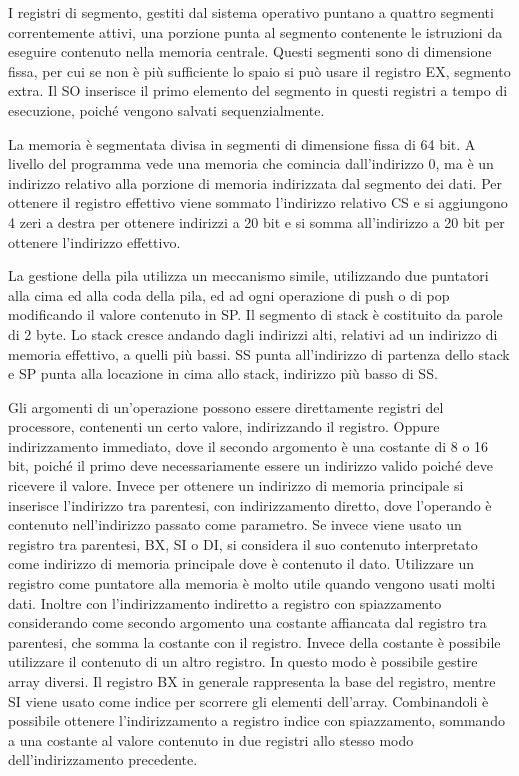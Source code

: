 \documentclass{article}
\numberwithin{equation}{subsection}
\begin{document}
I registri di segmento, gestiti dal sistema operativo puntano a quattro segmenti correntemente attivi, una porzione punta al segmento contenente le istruzioni da eseguire 
contenuto nella memoria centrale. Questi segmenti sono di dimensione fissa, per cui se non è più sufficiente lo spaio si può usare il registro EX, segmento extra. 
Il SO inserisce il primo elemento del segmento in questi registri a tempo di esecuzione, poiché vengono salvati sequenzialmente. 

La memoria è segmentata divisa in segmenti di dimensione fissa di 64 bit. A livello del programma vede una memoria che comincia dall'indirizzo 0, ma è un indirizzo relativo 
alla porzione di memoria indirizzata dal segmento dei dati. Per ottenere il registro effettivo viene sommato l'indirizzo relativo CS e si aggiungono 4 zeri a destra per ottenere 
indirizzi a 20 bit e si somma all'indirizzo a 20 bit per ottenere l'indirizzo effettivo. 

La gestione della pila utilizza un meccanismo simile, utilizzando due puntatori alla cima ed alla coda della pila, ed ad ogni operazione di push o di pop modificando il valore 
contenuto in SP. Il segmento di stack è costituito da parole di 2 byte. Lo stack cresce andando dagli indirizzi alti, relativi ad un indirizzo di memoria effettivo, a quelli più 
bassi. SS punta all'indirizzo di partenza dello stack e SP punta alla locazione in cima allo stack, indirizzo più basso di SS. 


Gli argomenti di un'operazione possono essere direttamente registri del processore, contenenti un certo valore, indirizzando il registro. Oppure indirizzamento immediato, 
dove il secondo argomento è una costante di 8 o 16 bit, poiché il primo deve necessariamente essere un indirizzo valido poiché deve ricevere il valore. Invece per ottenere 
un indirizzo di memoria principale si inserisce l'indirizzo tra parentesi, con indirizzamento diretto, dove l'operando è contenuto nell'indirizzo passato come parametro. 
Se invece viene usato un registro tra parentesi, BX, SI o DI, si considera il suo contenuto interpretato come indirizzo di memoria principale dove è contenuto il dato. 
Utilizzare un registro come puntatore alla memoria è molto utile quando vengono usati molti dati.  
Inoltre con l'indirizzamento indiretto a registro con spiazzamento considerando come secondo argomento una costante affiancata dal registro tra parentesi, che somma la 
costante con il registro. Invece della costante è possibile utilizzare il contenuto di un altro registro. 
In questo modo è possibile gestire array diversi. Il registro BX in generale rappresenta la base del registro, mentre SI viene usato come indice per scorrere gli elementi 
dell'array. Combinandoli è possibile ottenere l'indirizzamento a registro indice con spiazzamento, sommando a una costante al valore contenuto in due registri allo stesso 
modo dell'indirizzamento precedente. 
\end{document}
